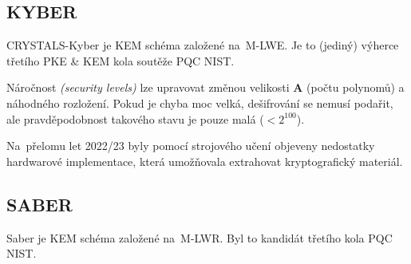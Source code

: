 \subsection{KYBER}

CRYSTALS-Kyber je KEM schéma založené na~M-LWE.
Je to (jediný) výherce třetího PKE \& KEM kola soutěže PQC NIST.

Náročnost \emph{(security levels)} lze upravovat změnou velikosti \textbf{A} (počtu polynomů) a náhodného rozložení.
Pokud je chyba moc velká, dešifrování se nemusí podařit, ale pravděpodobnost takového stavu je pouze malá ($< 2^{100}$).

Na~přelomu let 2022/23 byly pomocí strojového učení objeveny nedostatky hardwarové implementace, která umožňovala extrahovat kryptografický materiál.


\subsection{SABER}

Saber je KEM schéma založené na~M-LWR.
Byl to kandidát třetího kola PQC NIST.

